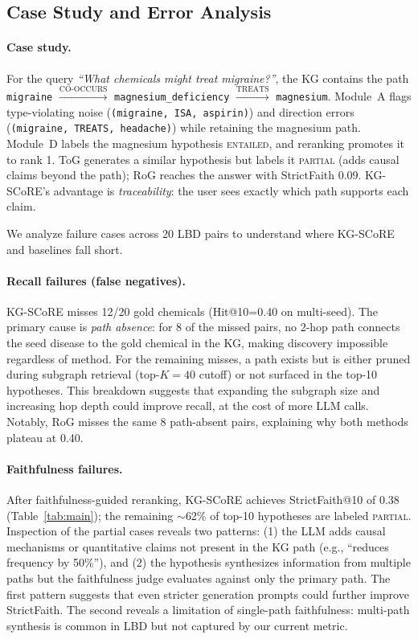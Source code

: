 \subsection{Case Study and Error Analysis}
\label{sec:exp:case}

\paragraph{Case study.}
For the query \emph{``What chemicals might treat migraine?''}, the KG contains the path \texttt{migraine} $\xrightarrow{\text{CO-OCCURS}}$ \texttt{magnesium\_deficiency} $\xrightarrow{\text{TREATS}}$ \texttt{magnesium}. Module~A flags type-violating noise (\texttt{(migraine, ISA, aspirin)}) and direction errors (\texttt{(migraine, TREATS, headache)}) while retaining the magnesium path. Module~D labels the magnesium hypothesis \textsc{entailed}, and reranking promotes it to rank 1. ToG generates a similar hypothesis but labels it \textsc{partial} (adds causal claims beyond the path); RoG reaches the answer with StrictFaith 0.09. KG-SCoRE's advantage is \emph{traceability}: the user sees exactly which path supports each claim.
\label{sec:exp:errors}

We analyze failure cases across 20 LBD pairs to understand where KG-SCoRE and baselines fall short.

\paragraph{Recall failures (false negatives).}
KG-SCoRE misses 12/20 gold chemicals (Hit@10=0.40 on multi-seed). The primary cause is \emph{path absence}: for 8 of the missed pairs, no 2-hop path connects the seed disease to the gold chemical in the KG, making discovery impossible regardless of method. For the remaining misses, a path exists but is either pruned during subgraph retrieval (top-$K{=}40$ cutoff) or not surfaced in the top-10 hypotheses. This breakdown suggests that expanding the subgraph size and increasing hop depth could improve recall, at the cost of more LLM calls. Notably, RoG misses the same 8 path-absent pairs, explaining why both methods plateau at 0.40.

\paragraph{Faithfulness failures.}
After faithfulness-guided reranking, KG-SCoRE achieves StrictFaith@10 of 0.38 (Table~\ref{tab:main}); the remaining $\sim$62\% of top-10 hypotheses are labeled \textsc{partial}. Inspection of the partial cases reveals two patterns: (1) the LLM adds causal mechanisms or quantitative claims not present in the KG path (e.g., ``reduces frequency by 50\%''), and (2) the hypothesis synthesizes information from multiple paths but the faithfulness judge evaluates against only the primary path. The first pattern suggests that even stricter generation prompts could further improve StrictFaith. The second reveals a limitation of single-path faithfulness: multi-path synthesis is common in LBD but not captured by our current metric.

